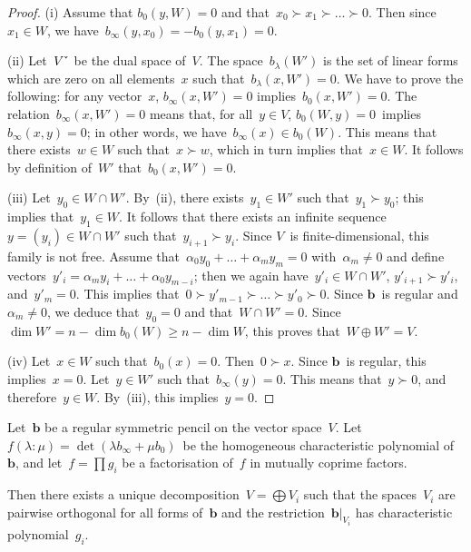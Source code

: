 \documentclass{article}%
\def\chk#1{#1^{\smash{\scalebox{.7}[1.4]{\rotatebox{90}{\guilsinglleft}}}}}
\begin{document}
\begin{proof}
(i) Assume that $b_0(y, W) = 0$ and that~$x_0 ≻ x_1 ≻ … ≻ 0$. Then since
$x_1 ∈ W$, we have~$b_{∞} (y, x_0) = -b_0 (y, x_1) = 0$.

(ii) Let~$\chk{V}$ be the dual space of~$V$. The space~$b_{λ}(W')$ is the set
of linear forms which are zero on all elements~$x$ such that~$b_{λ} (x,
W') = 0$.
We have to prove the following: for any vector~$x$, $b_{∞}(x, W') =
0$ implies~$b_0 (x, W') = 0$. The relation~$b_{∞} (x, W') = 0$ means
that, for all~$y ∈ V$, $b_0(W, y) = 0$~implies~$b_{∞} (x, y) = 0$; in
other words, we have~$b_{∞} (x) ∈ b_0(W)$. This means that there
exists~$w ∈ W$ such that~$x ≻ w$, which in turn implies that~$x ∈ W$. It
follows by definition of~$W'$ that~$b_0(x, W') = 0$.

(iii) Let~$y_0 ∈ W ∩ W'$. By~(ii), there exists~$y_1 ∈ W'$ such that~$y_1
≻ y_0$; this implies that~$y_1 ∈ W$. It follows that there exists an
infinite sequence~$y = (y_i) ∈ W ∩ W'$ such that~$y_{i+1} ≻ y_i$. Since
$V$~is finite-dimensional, this family is not free. Assume that~$α_0 y_0
+ … + α_m y_m = 0$ with~$α_m ≠ 0$ and define vectors~$y'_i = α_m y_i + …
+ α_0 y_{m-i}$; then we again have~$y'_i ∈ W ∩ W'$, $y'_{i+1} ≻ y'_i$,
and~$y'_m = 0$. This implies that~$0 ≻ y'_{m-1} ≻ … ≻ y'_0 ≻ 0$. Since
$\bm{b}$~is regular and~$α_m ≠ 0$, we deduce that~$y_0 = 0$ and that~$W ∩
W' = 0$. Since $\dim W' = n - \dim b_0(W) ≥ n - \dim W$, this proves
that~$W ⊕ W' = V$.

(iv) Let~$x ∈ W$ such that~$b_0(x) = 0$. Then~$0 ≻ x$. Since $\bm{b}$~is
regular, this implies~$x = 0$. 
Let~$y ∈ W'$ such that~$b_{∞} (y) = 0$. This means that~$y ≻ 0$, and
therefore~$y ∈ W$. By~(iii), this implies~$y = 0$.
\end{proof}%
\begin{lem}\label{lem:decomp-bezout}%
Let~$\bm{b}$ be a regular symmetric pencil on the vector space~$V$.
Let~$f(λ: μ) = \det (λ b_{∞} + μ b_0)$~be the homogeneous characteristic
polynomial of~$\bm{b}$, and let~$f = ∏ g_i$ be a factorisation of~$f$ in
mutually coprime factors.

Then there exists a unique decomposition~$V = ⨁ V_i$ such that the
spaces~$V_i$ are pairwise orthogonal for all forms of~$\bm{b}$ and the
restriction~$\bm{b}|_{V_i}$ has characteristic polynomial~$g_i$.
\end{lem}
\end{document}

